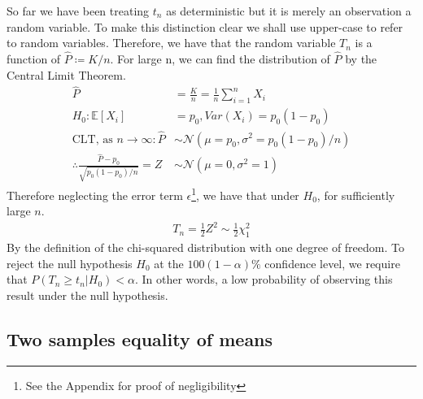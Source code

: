 \documentclass[]{article}
\newcommand{\E}{\mathbb{E}}
\newcommand{\Gaussian}{\mathcal{N}}
\begin{document}
%
So far we have been treating $t_n$ as deterministic but it is merely an observation a random variable. To make this distinction clear we shall use upper-case to refer to random variables. Therefore, we have that the random variable $T_n$ is a function of $\hat{P} \coloneqq K/n$. For large n, we can find the distribution of $\hat{P}$ by the Central Limit Theorem.
%
\begin{align*}
\hat{P} &= \frac{K}{n} = \frac{1}{n} \sum_{i=1}^{n} X_i \\
H_0: \E[X_i] &= p_0, Var(X_i) = p_0(1-p_0) \\
\text{CLT, as }n \rightarrow \infty: \hat{P} &\sim \Gaussian\left(\mu=p_0, \sigma^2=p_0(1-p_0)/n\right) \\
\therefore \frac{\hat{P}-p_0}{\sqrt{p_0(1-p_0)/n}} = Z &\sim \Gaussian(\mu=0,\sigma^2=1)
\end{align*}
%
Therefore neglecting the error term $\epsilon$\footnote{See the Appendix for proof of negligibility}, we have that under $H_0$, for sufficiently large $n$.
%
\begin{align}
T_n = \frac{1}{2} Z^2 \sim \frac{1}{2} \chi_1^2
\end{align}
%
By the definition of the chi-squared distribution with one degree of freedom. To reject the null hypothesis $H_0$ at the $100(1-\alpha)\%$ confidence level, we require that $P(T_n \geq t_n | H_0) < \alpha$. In other words, a low probability of observing this result under the null hypothesis.

\subsection{Two samples equality of means}
\end{document}

